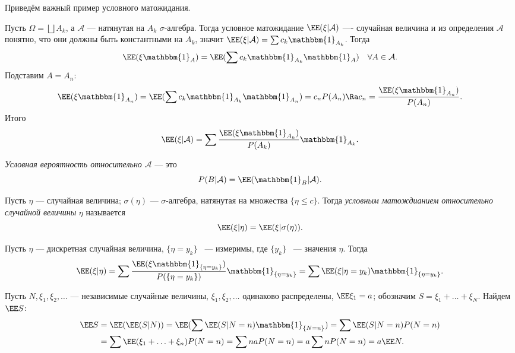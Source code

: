  Приведём важный пример условного матожидания. 

 \begin{example}
    Пусть $\Omega = \bigsqcup A_k$, а $\mathcal{A}$ --- натянутая на $A_k$ $\sigma$-алгебра.
    Тогда условное матожидание
     $\EE (\xi | \mathcal{A})$ ---- случайная величина  и из определения $\mathcal{A}$ понятно, что они должны быть константными на $A_k$, значит $\EE (\xi | \mathcal{A}) = \sum c_k \mathbbm{1}_{A_k}$. Тогда
     $$\EE (\xi \mathbbm{1}_A) = \EE (\sum c_k \mathbbm{1}_{A_k} \mathbbm{1}_A) \quad \forall A\in \mathcal{A}.$$ Подставим $A = A_n$:
     $$\EE (\xi\mathbbm{1}_{A_n}) = \EE (\sum c_k \mathbbm{1}_{A_k} \mathbbm{1}_{A_n}) = c_n P(A_n) \Ra  c_n = \frac{\EE (\xi\mathbbm{1}_{A_n})}{P(A_n)}.$$
     Итого
     $$\EE (\xi | \mathcal{A}) = \sum \frac{\EE (\xi\mathbbm{1}_{A_k})}{P(A_k)} \mathbbm{1}_{A_k}.$$
 \end{example}

 \begin{definition}
     \textit{Условная вероятность относительно} $\mathcal{A}$ --- это
     $$P(B | \mathcal{A} ) = \EE (\mathbbm{1}_B | \mathcal{A}).$$
 \end{definition}

 \begin{definition}
     Пусть $\eta$ --- случайная величина; $\sigma(\eta)$ --- $\sigma$-алгебра, натянутая на множества $\{\eta \le c\}$. Тогда \textit{условным матождианием относительно случайной величины} $\eta$ называется
     $$\EE (\xi | \eta) = \EE (\xi | \sigma(\eta)).$$
 \end{definition}

 \begin{example}
     Пусть $\eta$ --- дискретная случайная величина, $\{\eta = y_k\}$ ~--- измеримы, где $\{y_k\}$ ~--- значения $\eta$. Тогда
     $$\EE (\xi | \eta) = \sum \frac{\EE (\xi \mathbbm{1}_{\{\eta = y_k\}})}{P(\{\eta = y_k\})} \mathbbm{1}_{\{\eta = y_k\}} =
         \sum \EE (\xi | \eta = y_k)\mathbbm{1}_{\{\eta = y_k\}}.$$
 \end{example}

 \begin{example}
     Пусть $N, \xi_1, \xi_2, \ldots$ --- независимые случайные величины, $\xi_1, \xi_2, \ldots$ одинаково распределены, $\EE \xi_1 = a$; обозначим
     $S = \xi_1 + \ldots + \xi_N$. Найдем $\EE S$:
     \begin{align*}
         \EE S &= \EE (\EE (S | N)) = \EE (\sum \EE (S | N = n)\mathbbm{1}_{\{N = n\}}) = \sum \EE (S | N = n) P(N = n) \\&= \sum \EE (\xi_1 + \ldots + \xi_n) P(N = n) = \sum na P(N = n) =
         a\sum nP(N= n) = a\EE N.
     \end{align*}

 \end{example}

